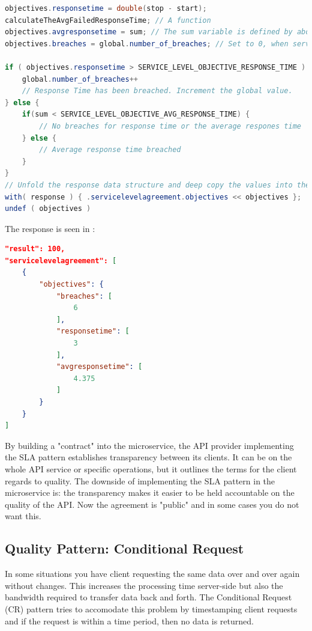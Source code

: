 \documentclass[12pt]{article}
\begin{document}
\begin{lstlisting}[caption=slaOperation, captionpos=b, language=java, label=slaOperation, frame=single]
objectives.responsetime = double(stop - start);
calculateTheAvgFailedResponseTime; // A function
objectives.avgresponsetime = sum; // The sum variable is defined by above executed function
objectives.breaches = global.number_of_breaches; // Set to 0, when service is initialized

if ( objectives.responsetime > SERVICE_LEVEL_OBJECTIVE_RESPONSE_TIME ) {
    global.number_of_breaches++
    // Response Time has been breached. Increment the global value. 
} else {
    if(sum < SERVICE_LEVEL_OBJECTIVE_AVG_RESPONSE_TIME) {
        // No breaches for response time or the average respones time
    } else {
        // Average response time breached
    }
}
// Unfold the response data structure and deep copy the values into the tree
with( response ) { .servicelevelagreement.objectives << objectives };
undef ( objectives )
\end{lstlisting}

The response is seen in \cite{lst:slaResponse}:

\begin{lstlisting}[caption=The response to the client when a calculation is requested, 
captionpos=b, language=json, label=slaResponse]
"result": 100,
"servicelevelagreement": [
    {
        "objectives": {
            "breaches": [
                6
            ],
            "responsetime": [
                3
            ],
            "avgresponsetime": [
                4.375
            ]
        }
    }
]
\end{lstlisting}

By building a "contract" into the microservice, the API provider implementing the SLA pattern establishes transparency between its clients. It can be on the whole API service or specific operations, but it outlines the terms for the client regards to quality. The downside of implementing the SLA pattern in the microservice is: the transparency makes it easier to be held accountable on the quality of the API. Now the agreement is "public" and in some cases you do not want this.

\subsection{Quality Pattern: Conditional Request}
In some situations you have client requesting the same data over and over again without changes. This increases the processing time server-side but also the bandwidth required to transfer data back and forth. The Conditional Request (CR) pattern tries to accomodate this problem by timestamping client requests and if the request is within a time period, then no data is returned. \\
\end{document}
